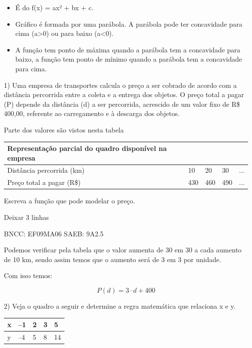 \begin{escolha}
{{{\begin{escolha}
{{{\begin{itemize}
\item
  É do f(x) = ax² + bx + c.
\item
  Gráfico é formada por uma parábola. A parábola pode ter concavidade
  para cima (a\textgreater0) ou para baixo (a\textless0).
\item
  A função tem ponto de máxima quando a parábola tem a concavidade para
  baixo, a função tem ponto de mínimo quando a parábola tem a
  concavidade para cima.
\end{itemize}


1) Uma empresa de transportes calcula o preço a ser cobrado de acordo
com a distância percorrida entre a coleta e a entrega dos objetos. O
preço total a pagar (P) depende da distância (d) a ser percorrida,
acrescido de um valor fixo de R\$ 400,00, referente ao carregamento e à
descarga dos objetos.

Parte dos valores são vistos nesta tabela

\begin{longtable}[]{@{}lllll@{}}
\toprule\noalign{}
\textbf{Representação parcial do quadro disponível na empresa} & & &
& \\
\midrule\noalign{}
\endhead
\bottomrule\noalign{}
\endlastfoot
Distância percorrida (km) & 10 & 20 & 30 & ... \\
Preço total a pagar (R\$) & 430 & 460 & 490 & ... \\
\end{longtable}

Escreva a função que pode modelar o preço.

Deixar 3 linhas

BNCC: EF09MA06 SAEB: 9A2.5

Podemos verificar pela tabela que o valor aumenta de 30 em 30 a cada
aumento de 10 km, sendo assim temos que o aumento será de 3 em 3 por
unidade.

Com isso temos:

\[P\left( d \right) = 3 \cdot d + 400\]

2) Veja o quadro a seguir e determine a regra matemática que relaciona x
e y.

\begin{longtable}[]{@{}lllll@{}}
\toprule\noalign{}
x & --1 & 2 & 3 & 5 \\
\midrule\noalign{}
\endhead
\bottomrule\noalign{}
\endlastfoot
y & --4 & 5 & 8 & 14 \\
\end{longtable}

}}}
\end{escolha}}}}
\end{escolha}
